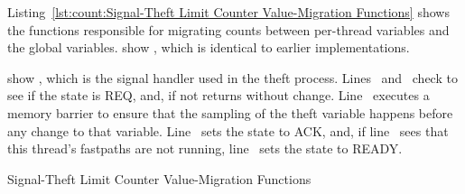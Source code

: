 \begin{fcvref}
Listing~\ref{lst:count:Signal-Theft Limit Counter Value-Migration Functions}
shows the functions responsible for migrating counts between per-thread
variables and the global variables.
 show ,
which is identical to earlier
implementations.
\end{fcvref}
\begin{fcvref}
 show ,
which is the signal
handler used in the theft process.
Lines~ and~ check to see if
the  state is REQ, and, if not
returns without change.
Line~ executes a memory barrier to ensure that the sampling of the
theft variable happens before any change to that variable.
Line~ sets the  state to ACK, and, if
line~ sees that
this thread's fastpaths are not running, line~ sets the 
state to READY\@.
\end{fcvref}

\fi

\begin{listing}[tbp]

\caption{Signal-Theft Limit Counter Value-Migration Functions}
\label{lst:count:Signal-Theft Limit Counter Value-Migration Functions}
\end{listing}

